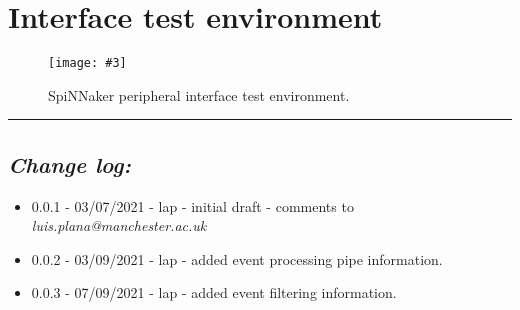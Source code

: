 \documentclass[11pt,a4paper,twoside]{article}
\newcommand{\image}[5][]
{
\begin{figure}[#2]
   \begin{center}
      \texttt{[image: \#3]}
      \caption{#5}
      \label{fig:#4}
   \end{center}
\end{figure}
}
\begin{document}
\clearpage
\section{Interface test environment}


\image[width = 0.8 \textwidth]{!h}{spif_test_env}{fig:spif_test}
{SpiNNaker peripheral interface test environment.}


\vspace*{1.0cm}
\par\noindent\rule{\linewidth}{2pt}


\subsection*{\itshape Change log:}


\begin{itemize}
	 mm 
	\item 0.0.1 - 03/07/2021 - lap - initial draft - comments to {\itshape luis.plana@manchester.ac.uk}
	\item 0.0.2 - 03/09/2021 - lap - added event processing pipe information.
	\item 0.0.3 - 07/09/2021 - lap - added event filtering information.
\end{itemize}
\end{document}
